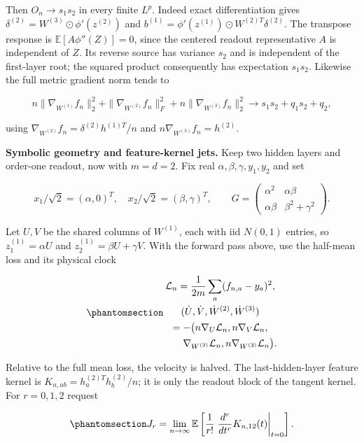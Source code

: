 \documentclass[
  11pt,
]{article}
\theoremstyle{definition}
\theoremstyle{plain}
\theoremstyle{plain}
\theoremstyle{plain}
\theoremstyle{remark}
\begin{document}
Then \(O_n\to s_1s_2\) in every finite \(L^p\). Indeed exact
differentiation gives \(\delta^{(2)}=W^{(3)}\odot\phi'(z^{(2)})\) and
\(b^{(1)}=\phi'(z^{(1)})\odot W^{(2)T}\delta^{(2)}\). The transpose
response is \(\mathbb E[A\phi''(Z)]=0\), since the centered readout
representative \(A\) is independent of \(Z\). Its reverse source has
variance \(s_2\) and is independent of the first-layer root; the squared
product consequently has expectation \(s_1s_2\). Likewise the full
metric gradient norm tends to

\[
n\|\nabla_{W^{(1)}}f_n\|_2^2+
\|\nabla_{W^{(2)}}f_n\|_F^2+
n\|\nabla_{W^{(3)}}f_n\|_2^2
\longrightarrow s_1s_2+q_1s_2+q_2,
\]

using \(\nabla_{W^{(2)}}f_n=\delta^{(2)}h^{(1)T}/n\) and
\(n\nabla_{W^{(3)}}f_n=h^{(2)}\).

\textbf{Symbolic geometry and feature-kernel jets.} Keep two hidden
layers and order-one readout, now with \(m=d=2\). Fix real
\(\alpha,\beta,\gamma,y_1,y_2\) and set

\[
x_1/\sqrt2=(\alpha,0)^T,\quad
x_2/\sqrt2=(\beta,\gamma)^T,\qquad
G=\begin{pmatrix}\alpha^2&\alpha\beta\\
\alpha\beta&\beta^2+\gamma^2\end{pmatrix}.
\]

Let \(U,V\) be the shared columns of \(W^{(1)}\), each with iid
\(N(0,1)\) entries, so \(z_1^{(1)}=\alpha U\) and
\(z_2^{(1)}=\beta U+\gamma V\). With the forward pass above, use the
half-mean loss and its physical clock

\begin{equation}\protect\phantomsection\label{eq-mfp-kernel-example-clock}{
\begin{gathered}
\mathcal L_n=\frac1{2m}\sum_a(f_{n,a}-y_a)^2,\\
(\dot U,\dot V,\dot W^{(2)},\dot W^{(3)})\\
=-\bigl(n\nabla_U\mathcal L_n,n\nabla_V\mathcal L_n,\\
\qquad\nabla_{W^{(2)}}\mathcal L_n,n\nabla_{W^{(3)}}\mathcal L_n\bigr).
\end{gathered}
}\end{equation}

Relative to the full mean loss, the velocity is halved. The
last-hidden-layer feature kernel is \(K_{n,ab}=h_a^{(2)T}h_b^{(2)}/n\);
it is only the readout block of the tangent kernel. For \(r=0,1,2\)
request

\begin{equation}\protect\phantomsection\label{eq-mfp-kernel-example-jets}{
J_r=\lim_{n\to\infty}\mathbb E\left[
\frac1{r!}\left.\frac{d^r}{dt^r}K_{n,12}(t)\right|_{t=0}\right].
}\end{equation}
\end{document}
